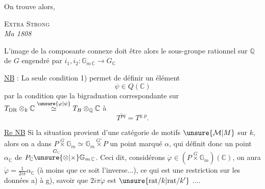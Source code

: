 On trouve alors,  
{\centering \textsc{Extra Strong}\\
\textit{Ma 1808}\par}

L'image  de la composante connexe doit être alors le sous-groupe rationnel sur $\mathbb Q$ de $G$ engendré par $i_1,i_2\colon\mathbb G_{m\,\mathbb C}\longrightarrow G_{\mathbb C}$ 

\uline{NB} : La seule condition 1) permet de définir un élément
\[
\psi\in Q(\mathbb C)
\]
par la condition que la bigraduation correspondante sur $T_{\mathrm{DR}}\otimes_k\mathbb C\overset{\unsure{\varphi|\psi}}{\simeq}T_B\otimes_{\mathbb Q}\mathbb C$  à
\[
\overline{T^{pq}}=T^{q,p}.
\]

\uline{Re NB} Si  la situation  provient d'une catégorie de motifs $\unsure{\mathcal M|M}$ sur $k$, alors on a dans $P\overset{G}{\times}\mathbb G_m\simeq\mathbb G_m\overset{G'}{\times}P$ un point marqué $\alpha$, qui définit donc un point $\alpha_{\mathbb C}$ de $P_{\mathbb C}\overset{G_{\mathbb C}}{\unsure{\otimes|\times}}\mathbb G_{m\,\mathbb C}$. Ceci dit, considérons $\dot{\varphi}\in(P\overset{G}{\times}\mathbb G_m)(\mathbb C)$, on aura $\dot{\varphi}=\frac{1}{2i\pi}\alpha_{\mathbb C}$ (à moins que ce soit l'inverse...), ce qui est une restriction  sur les données a) à g), savoir que $2i\pi\dot{\varphi}$ est $\unsure{\mathrm{rat}/k|\mathrm{rat}/k^{\smash{\prime}}}$ ....

